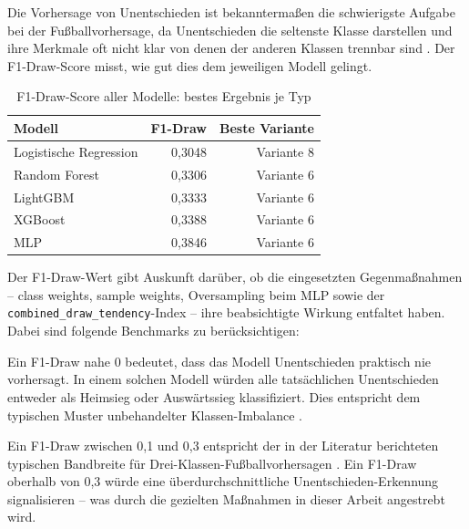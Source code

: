 Die Vorhersage von Unentschieden ist bekanntermaßen die schwierigste
Aufgabe bei der Fußballvorhersage, da Unentschieden die seltenste
Klasse darstellen und ihre Merkmale oft nicht klar von denen der
anderen Klassen trennbar sind \cite{HeGarcia2009,DobsonGoddard2011}.
Der F1-Draw-Score misst, wie gut dies dem jeweiligen Modell gelingt.

\begin{table}[h]
    \centering
    \caption{F1-Draw-Score aller Modelle: bestes Ergebnis je Typ}
    \label{tab:f1-draw}
    \begin{tabular}{l r r}
        \toprule
        \textbf{Modell} & \textbf{F1-Draw} & \textbf{Beste Variante} \\
        \midrule
        Logistische Regression & 0,3048 & Variante 8 \\
        Random Forest          & 0,3306 & Variante 6 \\
        LightGBM               & 0,3333 & Variante 6 \\
        XGBoost                & 0,3388 & Variante 6 \\
        MLP                    & 0,3846 & Variante 6 \\
        \bottomrule
    \end{tabular}
\end{table}

Der F1-Draw-Wert gibt Auskunft darüber, ob die eingesetzten Gegenmaßnahmen
-- class weights, sample weights, Oversampling beim MLP sowie der
\texttt{combined\_draw\_tendency}-Index -- ihre beabsichtigte Wirkung
entfaltet haben. Dabei sind folgende Benchmarks zu berücksichtigen:

Ein F1-Draw nahe 0 bedeutet, dass das Modell Unentschieden praktisch
nie vorhersagt. In einem solchen Modell würden alle tatsächlichen
Unentschieden entweder als Heimsieg oder Auswärtssieg klassifiziert.
Dies entspricht dem typischen Muster unbehandelter Klassen-Imbalance
\cite{JapkowiczStephen2002}.

Ein F1-Draw zwischen 0,1 und 0,3 entspricht der in der Literatur
berichteten typischen Bandbreite für Drei-Klassen-Fußballvorhersagen
\cite{BunkerThabtah2019,HubacekSourekZelezny2019}. Ein F1-Draw oberhalb
von 0,3 würde eine überdurchschnittliche Unentschieden-Erkennung
signalisieren -- was durch die gezielten Maßnahmen in dieser Arbeit
angestrebt wird.


